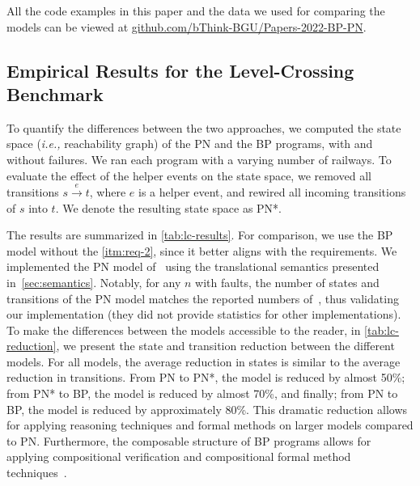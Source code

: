 \documentclass[10pt,journal,compsoc]{IEEEtran}
\theoremstyle{definition}
\newcommand{\ie}{\emph{i.e.,}\xspace}
\begin{document}
All the code examples in this paper and the data we used for comparing the models can be viewed at \url{github.com/bThink-BGU/Papers-2022-BP-PN}.

\subsection{Empirical Results for the Level-Crossing Benchmark}
\label{sec:results:lc}
To quantify the differences between the two approaches, we computed the state space (\ie reachability graph) of the PN and the BP programs, with and without failures. We ran each program with a varying number of railways. To evaluate the effect of the helper events on the state space, we removed all transitions $s \xrightarrow{e} t$, where $e$ is a helper event, and rewired all incoming transitions of $s$ into $t$. We denote the resulting state space as PN*.

The results are summarized in \autoref{tab:lc-results}. For comparison, we use the BP model without the \ref{itm:req-2}, since it better aligns with the requirements. We implemented the PN model of~\cite{ghazel2016customizable} using the translational semantics presented in~\autoref{sec:semantics}. Notably, for any $n$ with faults, the number of states and transitions of the PN model matches the reported numbers of~\cite{ghazel2016customizable}, thus validating our implementation (they did not provide statistics for other implementations). To make the differences between the models accessible to the reader, in \autoref{tab:lc-reduction}, we present the state and transition reduction between the different models. For all models, the average reduction in states is similar to the average reduction in transitions. From PN to PN*, the model is reduced by almost 50\%; from PN* to BP, the model is reduced by almost 70\%, and finally; from PN to BP, the model is reduced by approximately 80\%. This dramatic reduction allows for applying reasoning techniques and formal methods on larger models compared to PN. Furthermore, the composable structure of BP programs allows for applying compositional verification and compositional formal method techniques~\cite{harel2013relaxing}.
\end{document}
